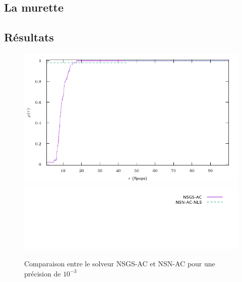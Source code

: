 \documentclass{CSMA2017}
\begin{document}
\subsection{La murette}
\subsection{Résultats}
\begin{figure}
  \centering
  \includegraphics{figure/LowWall_FEM.1e-3/simple/profile-LMGC_LowWall_FEM.pdf}
  \includegraphics{figure/LowWall_FEM.1e-3/simple/profile-LMGC_LowWall_FEM_legend.pdf}
  \caption{Comparaison entre le solveur NSGS-AC et NSN-AC pour une précision de $10^{-3}$}
  \label{fig:LowWall_FEM.1e-3.simple}
\end{figure}
\end{document}
